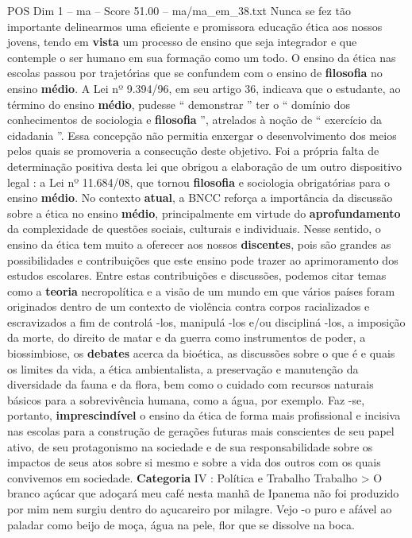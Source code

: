 \begin{textsample}{POS Dim 1 – ma – Score 51.00 – ma/ma\_em\_38.txt}
Nunca se fez tão importante delinearmos uma eficiente e promissora educação ética aos nossos jovens, tendo em \textbf{vista} um processo de ensino que seja integrador e que contemple o ser humano em sua formação como um todo.
O ensino da ética nas escolas passou por trajetórias que se confundem com o ensino de \textbf{filosofia} no ensino \textbf{médio}.
A Lei nº 9.394/96, em seu artigo 36, indicava que o estudante, ao término do ensino \textbf{médio}, pudesse “ demonstrar ” ter o “ domínio dos conhecimentos de sociologia e \textbf{filosofia} ”, atrelados à noção de “ exercício da cidadania ”.
Essa concepção não permitia enxergar o desenvolvimento dos meios pelos quais se promoveria a consecução deste objetivo.
Foi a própria falta de determinação positiva desta lei que obrigou a elaboração de um outro dispositivo legal : a Lei nº 11.684/08, que tornou \textbf{filosofia} e sociologia obrigatórias para o ensino \textbf{médio}.
No contexto \textbf{atual}, a BNCC reforça a importância da discussão sobre a ética no ensino \textbf{médio}, principalmente em virtude do \textbf{aprofundamento} da complexidade de questões sociais, culturais e individuais.
Nesse sentido, o ensino da ética tem muito a oferecer aos nossos \textbf{discentes}, pois são grandes as possibilidades e contribuições que este ensino pode trazer ao aprimoramento dos estudos escolares.
Entre estas contribuições e discussões, podemos citar temas como a \textbf{teoria} necropolítica e a visão de um mundo em que vários países foram originados dentro de um contexto de violência contra corpos racializados e escravizados a fim de controlá -los, manipulá -los e/ou discipliná -los, a imposição da morte, do direito de matar e da guerra como instrumentos de poder, a biossimbiose, os \textbf{debates} acerca da bioética, as discussões sobre o que é e quais os limites da vida, a ética ambientalista, a preservação e manutenção da diversidade da fauna e da flora, bem como o cuidado com recursos naturais básicos para a sobrevivência humana, como a água, por exemplo.
Faz -se, portanto, \textbf{imprescindível} o ensino da ética de forma mais profissional e incisiva nas escolas para a construção de gerações futuras mais conscientes de seu papel ativo, de seu protagonismo na sociedade e de sua responsabilidade sobre os impactos de seus atos sobre si mesmo e sobre a vida dos outros com os quais convivemos em sociedade. \textbf{Categoria} IV : Política e Trabalho Trabalho > O branco açúcar que adoçará meu café nesta manhã de Ipanema não foi produzido por mim nem surgiu dentro do açucareiro por milagre.
Vejo -o puro e afável ao paladar como beijo de moça, água na pele, flor que se dissolve na boca.

\end{textsample}
